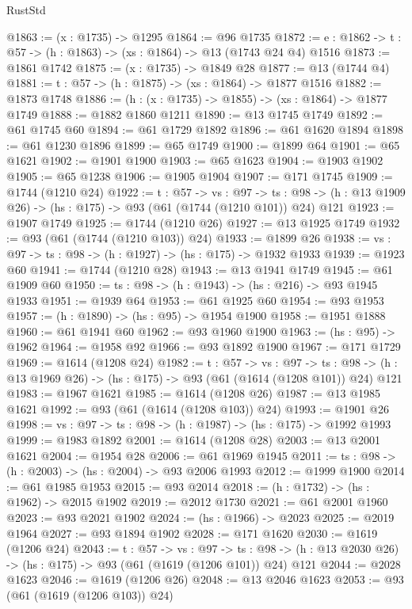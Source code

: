 \begin{lexlean}{RustStd}
\begin{coremodule}
@1863 := (x : @1735) -> @1295
@1864 := @96 @1735
@1872 := {e : @1862} -> {t : @57} -> (h : @1863) -> (xs : @1864) -> @13 (@1743 @24 @4) @1516
@1873 := @1861 @1742
@1875 := (x : @1735) -> @1849 @28
@1877 := @13 (@1744 @4)
@1881 := {t : @57} -> (h : @1875) -> (xs : @1864) -> @1877 @1516
@1882 := @1873 @1748
@1886 := (h : (x : @1735) -> @1855) -> (xs : @1864) -> @1877 @1749
@1888 := @1882 @1860 @1211
@1890 := @13 @1745 @1749
@1892 := @61 @1745 @60
@1894 := @61 @1729 @1892
@1896 := @61 @1620 @1894
@1898 := @61 @1230 @1896
@1899 := @65 @1749
@1900 := @1899 @64
@1901 := @65 @1621
@1902 := @1901 @1900
@1903 := @65 @1623
@1904 := @1903 @1902
@1905 := @65 @1238
@1906 := @1905 @1904
@1907 := @171 @1745
@1909 := @1744 (@1210 @24)
@1922 := {t : @57} ->
  {vs : @97} ->
  {ts : @98} -> (h : @13 @1909 @26) -> (hs : @175) -> @93 (@61 (@1744 (@1210 @101)) @24) @121
@1923 := @1907 @1749
@1925 := @1744 (@1210 @26)
@1927 := @13 @1925 @1749
@1932 := @93 (@61 (@1744 (@1210 @103)) @24)
@1933 := @1899 @26
@1938 := {vs : @97} -> {ts : @98} -> (h : @1927) -> (hs : @175) -> @1932 @1933
@1939 := @1923 @60
@1941 := @1744 (@1210 @28)
@1943 := @13 @1941 @1749
@1945 := @61 @1909 @60
@1950 := {ts : @98} -> (h : @1943) -> (hs : @216) -> @93 @1945 @1933
@1951 := @1939 @64
@1953 := @61 @1925 @60
@1954 := @93 @1953
@1957 := (h : @1890) -> (hs : @95) -> @1954 @1900
@1958 := @1951 @1888
@1960 := @61 @1941 @60
@1962 := @93 @1960 @1900
@1963 := (hs : @95) -> @1962
@1964 := @1958 @92
@1966 := @93 @1892 @1900
@1967 := @171 @1729
@1969 := @1614 (@1208 @24)
@1982 := {t : @57} ->
  {vs : @97} ->
  {ts : @98} -> (h : @13 @1969 @26) -> (hs : @175) -> @93 (@61 (@1614 (@1208 @101)) @24) @121
@1983 := @1967 @1621
@1985 := @1614 (@1208 @26)
@1987 := @13 @1985 @1621
@1992 := @93 (@61 (@1614 (@1208 @103)) @24)
@1993 := @1901 @26
@1998 := {vs : @97} -> {ts : @98} -> (h : @1987) -> (hs : @175) -> @1992 @1993
@1999 := @1983 @1892
@2001 := @1614 (@1208 @28)
@2003 := @13 @2001 @1621
@2004 := @1954 @28
@2006 := @61 @1969 @1945
@2011 := {ts : @98} -> (h : @2003) -> (hs : @2004) -> @93 @2006 @1993
@2012 := @1999 @1900
@2014 := @61 @1985 @1953
@2015 := @93 @2014
@2018 := (h : @1732) -> (hs : @1962) -> @2015 @1902
@2019 := @2012 @1730
@2021 := @61 @2001 @1960
@2023 := @93 @2021 @1902
@2024 := (hs : @1966) -> @2023
@2025 := @2019 @1964
@2027 := @93 @1894 @1902
@2028 := @171 @1620
@2030 := @1619 (@1206 @24)
@2043 := {t : @57} ->
  {vs : @97} ->
  {ts : @98} -> (h : @13 @2030 @26) -> (hs : @175) -> @93 (@61 (@1619 (@1206 @101)) @24) @121
@2044 := @2028 @1623
@2046 := @1619 (@1206 @26)
@2048 := @13 @2046 @1623
@2053 := @93 (@61 (@1619 (@1206 @103)) @24)

\end{coremodule}
\end{lexlean}
